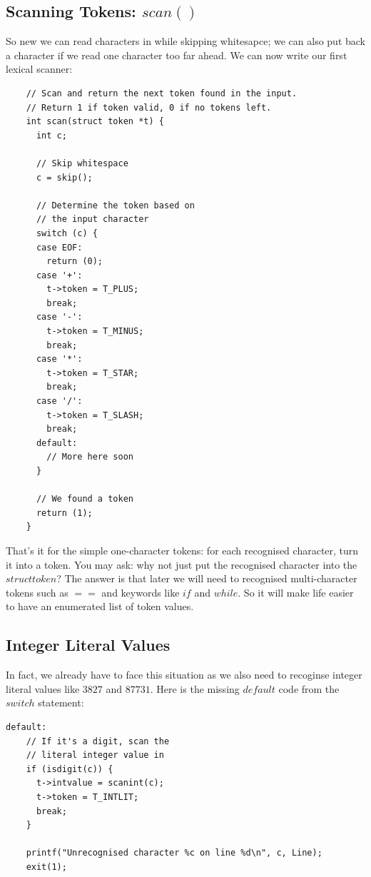 \documentclass[a4paper,12pt]{article}
\begin{document}
\subsection{Scanning Tokens: $scan()$}

So new we can read characters in while skipping whitesapce; we can also put back a character if we read one character too far ahead. We can now write our first lexical scanner:

\begin{lstlisting}
    // Scan and return the next token found in the input.
    // Return 1 if token valid, 0 if no tokens left.
    int scan(struct token *t) {
      int c;

      // Skip whitespace
      c = skip();

      // Determine the token based on
      // the input character
      switch (c) {
      case EOF:
        return (0);
      case '+':
        t->token = T_PLUS;
        break;
      case '-':
        t->token = T_MINUS;
        break;
      case '*':
        t->token = T_STAR;
        break;
      case '/':
        t->token = T_SLASH;
        break;
      default:
        // More here soon
      }

      // We found a token
      return (1);
    }
\end{lstlisting}

That's it for the simple one-character tokens: for each recognised character, turn it into a token. You may ask: why not just put the recognised character into the $struct token$? The answer is that later we will need to recognised multi-character tokens such as $==$ and keywords like $if$ and $while$. So it will make life easier to have an enumerated list of token values.

\subsection{Integer Literal Values}

In fact, we already have to face this situation as we also need to recoginse integer literal values like $3827$ and $87731$. Here is the missing $default$ code from the $switch$ statement:

\begin{lstlisting}
default:
    // If it's a digit, scan the
    // literal integer value in
    if (isdigit(c)) {
      t->intvalue = scanint(c);
      t->token = T_INTLIT;
      break;
    }

    printf("Unrecognised character %c on line %d\n", c, Line);
    exit(1);
\end{lstlisting}
\end{document}
